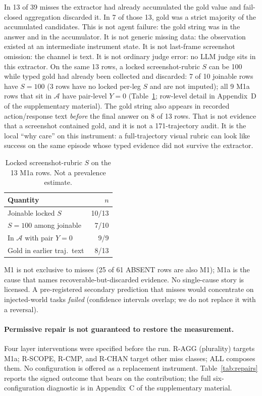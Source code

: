 \documentclass[sigconf,anonymous]{aamas}
\newcommand{\A}{\mathcal{A}}
\begin{document}
In 13 of 39 misses the extractor had already accumulated the gold value and fail-closed aggregation discarded it.
In 7 of those 13, gold was a strict majority of the accumulated candidates.
This is not agent failure: the gold string was in the answer and in the accumulator.
It is not generic missing data: the observation existed at an intermediate instrument state.
It is not last-frame screenshot omission: the channel is text.
It is not ordinary judge error: no LLM judge sits in this extractor.
On the same 13 rows, a locked screenshot-rubric $S$ can be 100 while typed gold had already been collected and discarded: 7 of 10 joinable rows have $S=100$ (3 rows have no locked per-leg $S$ and are not imputed); all 9 M1a rows that sit in $\A$ have pair-level $Y=0$ (Table~\ref{tab:m1a-s100}; row-level detail in Appendix~D of the supplementary material).
The gold string also appears in recorded action/response text \emph{before} the final answer on 8 of 13 rows.
That is not evidence that a screenshot contained gold, and it is not a 171-trajectory audit.
It is the local ``why care'' on this instrument: a full-trajectory visual rubric can look like success on the same episode whose typed evidence did not survive the extractor.

\begin{table}[H]
\centering
\caption{Locked screenshot-rubric $S$ on the 13 M1a rows. Not a prevalence estimate.}
\label{tab:m1a-s100}
\small
\begin{tabular}{lr}
\toprule
Quantity & $n$ \\
\midrule
Joinable locked $S$ & 10/13 \\
$S=100$ among joinable & 7/10 \\
In $\A$ with pair $Y=0$ & 9/9 \\
Gold in earlier traj.\ text & 8/13 \\
\bottomrule
\end{tabular}
\end{table}

M1 is not exclusive to misses (25 of 61 ABSENT rows are also M1); M1a is the cause that names recoverable-but-discarded evidence.
No single-cause story is licensed.
A pre-registered secondary prediction that misses would concentrate on injected-world tasks \emph{failed} (confidence intervals overlap; we do not replace it with a reversal).

\paragraph{Permissive repair is not guaranteed to restore the measurement.}
Four layer interventions were specified before the run.
R-AGG (plurality) targets M1a; R-SCOPE, R-CMP, and R-CHAN target other miss classes; ALL composes them.
No configuration is offered as a replacement instrument.
Table~\ref{tab:repairs} reports the signed outcome that bears on the contribution; the full six-configuration diagnostic is in Appendix~C of the supplementary material.
\end{document}
